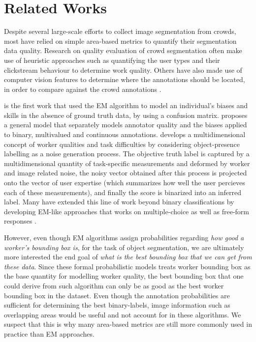 \documentclass[letterpaper]{article} %
\begin{document}
\section{Related Works}
\par Despite several large-scale efforts to collect image segmentation from crowds\cite{Lin2014,MartinFTM01,Torralba2010,pascal-voc-2012}, most have relied on simple area-based metrics to quantify their segmentation data quality. Research on quality evaluation of crowd segmentation often make use of heuristic approaches such as quantifying the user types and their clickstream behaviour to determine work quality\cite{Cabezas2015,Sameki2015}. Others have also made use of computer vision features to determine where the annotations should be located, in order to compare against the crowd annotations \cite{Vittayakorn2011,Russakovsky2015}.
\par \cite{Dawid1979} is the first work that used the EM algorithm to model an individual's biases and skills in the absence of ground truth data, by using a confusion matrix. \cite{OCWelinder2010} proposes a general model that separately models annotator quality and the biases applied to binary, multivalued and continuous annotations. \cite{MDWWelinder2010} develops a multidimensional concept of worker qualities and task difficulties by considering object-presence labelling as a noise generation process. The objective truth label is captured by a multidimensional quantity of task-specific measurements and deformed by worker and image related noise, the noisy vector obtained after this process is projected onto the vector of user expertise (which summarizes how well the user percieves each of these measurements), and finally the score is binarized into an inferred label. Many have extended this line of work beyond binary classifications by developing EM-like approaches that works on multiple-choice \cite{Karger2013} as well as free-form responses \cite{Lin2012}. 
\par However, even though EM algorithms assign probabilities regarding  \textit{how good a worker's bounding box is}, for the task of object segmentation, we are ultimately more interested the end goal of \textit{what is the best bounding box that we can get from these data}. Since these formal probabilistic models treats worker bounding box as the base quantity for modelling worker quality, the best bounding box that one could derive from such algorithm can only be as good as the best worker bounding box in the dataset.  Even though the annotation probabilities are sufficient for determining the best binary-labels, image information such as overlapping areas would be useful and not account for in these algorithms. We suspect that this is why many area-based metrics are still more commonly used in practice than EM approaches.
\end{document}
